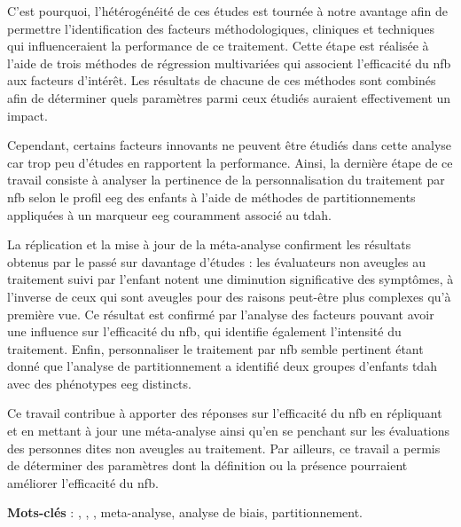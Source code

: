 C'est pourquoi, l'hétérogénéité de ces études est tournée à notre avantage afin de permettre l'identification 
des facteurs méthodologiques, cliniques et techniques qui influenceraient la performance de ce traitement. Cette étape 
est réalisée à l'aide de trois méthodes de régression multivariées qui associent l'efficacité du \gls{nfb} aux facteurs d'intérêt. 
Les résultats de chacune de ces méthodes sont combinés afin de déterminer quels paramètres parmi ceux étudiés auraient effectivement un impact. 

Cependant, certains facteurs innovants ne peuvent être étudiés dans cette analyse car trop peu d'études en rapportent la performance. 
Ainsi, la dernière étape de ce travail consiste à analyser la pertinence de la personnalisation du traitement par \gls{nfb} selon le profil 
\gls{eeg} des enfants à l'aide de méthodes de partitionnements appliquées à un marqueur \gls{eeg} couramment associé au \gls{tdah}. 

La réplication et la mise à jour de la méta-analyse confirment les résultats obtenus par le passé sur davantage d'études : 
les évaluateurs non aveugles au traitement suivi par l'enfant notent une diminution significative des symptômes, à l'inverse 
de ceux qui sont aveugles pour des raisons peut-être plus complexes qu'à première vue. Ce résultat est confirmé par l'analyse 
des facteurs pouvant avoir une influence sur l'efficacité du \gls{nfb}, qui identifie également l'intensité du traitement. Enfin, 
personnaliser le traitement par \gls{nfb} semble pertinent étant donné que l'analyse de partitionnement a identifié deux groupes d'enfants 
\gls{tdah} avec des phénotypes \gls{eeg} distincts.

Ce travail contribue à apporter des réponses sur l'efficacité du \gls{nfb} en répliquant et en mettant à jour une méta-analyse ainsi qu'en se penchant sur 
les évaluations des personnes dites non aveugles au traitement. Par ailleurs, ce travail a permis de déterminer des paramètres dont la définition ou la présence 
pourraient améliorer l'efficacité du \gls{nfb}.

\large{\textbf{Mots-clés}} : , , , meta-analyse, analyse de biais, partitionnement.